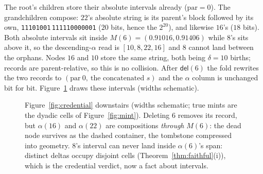 \documentclass[11pt]{article}
\newcommand{\code}[1]{\texttt{#1}}
\newcommand{\del}{\mathsf{del}}
\begin{document}
\noindent The root's children store their absolute intervals already
($\mathrm{par} = 0$). The grandchildren compose: $22$'s absolute
string is its parent's block followed by its own,
\code{11101001}\,\code{111110000001} ($20$ bits, hence the
$2^{20}$), and likewise $16$'s ($18$ bits). Both absolute intervals
sit inside $M(6) = (0.91016, 0.91406)$ while $8$'s sits above it, so
the descending-$\alpha$ read is $[10, 8, 22, 16]$ and $8$ cannot
land between the orphans. Nodes $16$ and $10$ store the same
string, both being $\delta = 10$ births; records are
parent-relative, so this is no collision. After $\del(6)$ the fold
rewrites the two records to $(\mathrm{par}\ 0,\ \text{the
concatenated } s)$ and the $\alpha$ column is unchanged bit for bit.
Figure~\ref{fig:nest} draws these intervals (widths schematic).

\begin{figure}[h]
\centering
{}
\caption{Figure~\ref{fig:credential} downstairs (widths schematic;
true mints are the dyadic cells of Figure~\ref{fig:mint}). Deleting
$6$ removes its record, but $\alpha(16)$ and $\alpha(22)$ are
compositions \emph{through} $M(6)$: the dead node survives as the
dashed container, the tombstone compressed into geometry. $8$'s
interval can never land inside $\alpha(6)$'s span: distinct deltas
occupy disjoint cells (Theorem~\ref{thm:faithful}(i)), which is the
credential verdict, now a fact about intervals.}
\label{fig:nest}
\end{figure}
\end{document}
